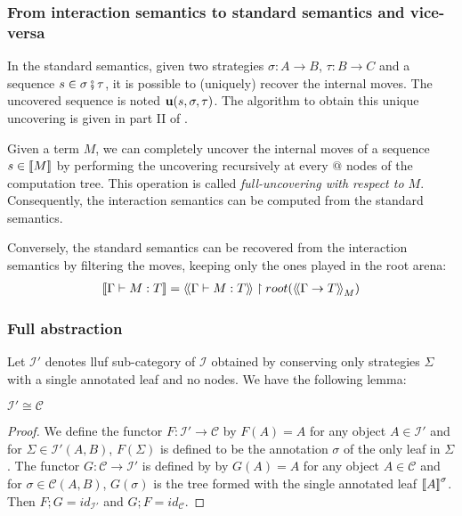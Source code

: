 \subsubsection{From interaction semantics to standard semantics and vice-versa}

In the standard semantics, given two strategies $\sigma : A \rightarrow B$, $\tau : B \rightarrow C$ and
a sequence $s \in \sigma \fatsemi \tau$, it is possible to (uniquely) recover the internal moves. The uncovered sequence is noted
 ${\bf u}(s, \sigma, \tau)$. The algorithm to obtain this unique uncovering is given in part II of \cite{hylandong_pcf}.

Given a term $M$, we can completely uncover the internal moves of a sequence $s\in{[\![M ]\!]}$
by performing the uncovering recursively at every $@$ nodes of the computation tree.
This operation is called \emph{full-uncovering with respect to $M$}.
Consequently, the interaction semantics can be computed from the standard semantics.

Conversely, the standard semantics can be recovered from the interaction semantics by filtering the moves, keeping only the ones played
in the root arena:
\begin{eqnarray}
 {[\![\Gamma \vdash M : T ]\!]} = {\langle\!\langle \Gamma \vdash M : T \rangle\!\rangle} \upharpoonright root({\langle\!\langle \Gamma \rightarrow T \rangle\!\rangle}_M) \label{eqn:int_std_gamsem}
\end{eqnarray}


\subsubsection{Full abstraction}

Let $\mathcal{I'}$ denotes lluf sub-category of $\mathcal{I}$ obtained by conserving only strategies $\Sigma$ with a single
annotated leaf and no nodes. We have the following lemma:
\begin{lem}
$\mathcal{I'} \cong \mathcal{C}$
\end{lem}
\begin{proof}
We define the functor $F:\mathcal{I'} \rightarrow \mathcal{C}$
by $F(A) = A$ for any object $A\in \mathcal{I'}$ and for $\Sigma \in \mathcal{I'}(A,B)$,
$F(\Sigma)$ is defined to be the annotation $\sigma$ of the only leaf in $\Sigma$.
The functor $G:\mathcal{C} \rightarrow \mathcal{I'}$ is defined by
by $G(A) = A$ for any object $A\in \mathcal{C}$ and for $\sigma \in \mathcal{C}(A,B)$,
$G(\sigma)$ is the tree formed with the single annotated leaf ${[\![ A ]\!]}^\sigma$.
Then $F;G =id_{\mathcal{I'}}$ and $G;F =id_{\mathcal{C}}$.
\end{proof}

